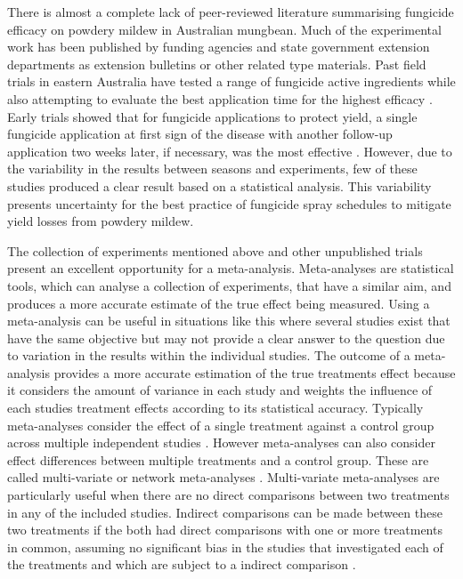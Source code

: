 \documentclass[agronomy,article,submit,moreauthors,pdftex]{mdpi}
\begin{document}
There is almost a complete lack of peer-reviewed literature summarising fungicide efficacy on powdery mildew in Australian mungbean.
Much of the experimental work has been published by funding agencies and state government extension departments as extension bulletins or other related type materials.
Past field trials in eastern Australia have tested a range of fungicide active ingredients while also attempting to evaluate the best application time for the highest efficacy \citep{goolhi2013, premer2013, Millmerran2013, Marysmount2013, SueThompson2016, Kelly2017a, Thompson2016}.
Early trials showed that for fungicide applications to protect yield, a single fungicide application at first sign of the disease with another follow-up application two weeks later, if necessary, was the most effective \citep{SueThompson2016, Sparks2017}.
However, due to the variability in the results between seasons and experiments, few of these studies produced a clear result based on a statistical analysis.
This variability presents uncertainty for the best practice of fungicide spray schedules to mitigate yield losses from powdery mildew.

The collection of experiments mentioned above and other unpublished trials present an excellent opportunity for a meta-analysis.
Meta-analyses are statistical tools, which can analyse a collection of experiments, that have a similar aim, and produces a more accurate estimate of the true effect being measured.
Using a meta-analysis can be useful in situations like this where several studies exist that have the same objective but may not provide a clear answer to the question due to variation in the results within the individual studies.
The outcome of a meta-analysis provides a more accurate estimation of the true treatments effect because it considers the amount of variance in each study and weights the influence of each studies treatment effects according to its statistical accuracy.
Typically meta-analyses consider the effect of a single treatment against a control group across multiple independent studies \citep{Madden2011}.
However meta-analyses can also consider effect differences between multiple treatments and a control group.
These are called multi-variate or network meta-analyses \citep{Madden2016}.
Multi-variate meta-analyses are particularly useful when there are no direct comparisons between two treatments in any of the included studies.
Indirect comparisons can be made between these two treatments if the both had direct comparisons with one or more treatments in common, assuming no significant bias in the studies that investigated each of the treatments and which are subject to a indirect comparison \citep{Jansen2011}.
\end{document}

